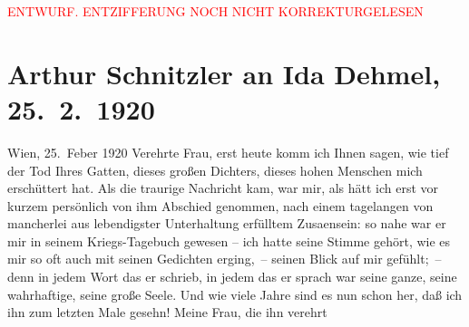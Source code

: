 
\begin{center}
            \textcolor{red}{ENTWURF. ENTZIFFERUNG NOCH NICHT KORREKTURGELESEN}
                      \end{center}
            
               \section[Arthur Schnitzler an Ida Dehmel, 25. 2. 1920]{ Arthur Schnitzler an Ida Dehmel, 25. 2. 1920}\nopagebreak{}\rehead{ }\begin{ledgroupsized}[t]{13cm}\normalsize\beginnumbering{} \toendnotes[C]{\smallbreak\pagebreak[2]} 
\toendnotes[C]{\smallbreak}\pstart
           \raggedleft{}{\pb}Wien, 25. Feber 1920\pend
           \pstart
           Verehrte Frau, erst heute komm ich Ihnen sagen, wie tief der
                    Tod Ihres Gatten, dieses großen Dichters,
                    dieses hohen Menschen mich erschüttert hat. Als die traurige Nachricht kam, war
                    mir, als hätt ich erst vor kurzem persönlich von ihm Abschied genommen, nach
                    einem tagelangen von mancherlei aus lebendigster Unterhaltung erfülltem Zusa{\geminationm}ensein: so nahe war er mir in seinem Kriegs-{\pb}Tagebuch gewesen – ich hatte seine Stimme gehört, wie es mir so oft
                    auch mit seinen Gedichten erging, – seinen Blick auf mir gefühlt; – denn in
                    jedem Wort das er schrieb, in jedem das er sprach war seine ganze, seine
                    wahrhaftige, seine große Seele. Und wie viele Jahre sind es nun schon her, daß
                    ich ihn zum letzten Male gesehn!\pend
           \pstart
           Meine Frau, die ihn verehrt

\end{ledgroupsized}
